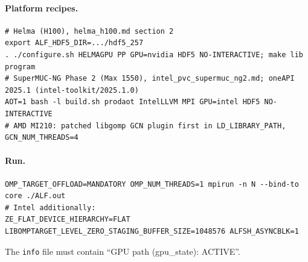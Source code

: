 \paragraph{Platform recipes.}
\begin{lstlisting}
# Helma (H100), helma_h100.md section 2
export ALF_HDF5_DIR=.../hdf5_257
. ./configure.sh HELMAGPU PP GPU=nvidia HDF5 NO-INTERACTIVE; make lib program
# SuperMUC-NG Phase 2 (Max 1550), intel_pvc_supermuc_ng2.md; oneAPI 2025.1 (intel-toolkit/2025.1.0)
AOT=1 bash -l build.sh prodaot IntelLLVM MPI GPU=intel HDF5 NO-INTERACTIVE
# AMD MI210: patched libgomp GCN plugin first in LD_LIBRARY_PATH, GCN_NUM_THREADS=4
\end{lstlisting}

\paragraph{Run.}
\begin{lstlisting}
OMP_TARGET_OFFLOAD=MANDATORY OMP_NUM_THREADS=1 mpirun -n N --bind-to core ./ALF.out
# Intel additionally:
ZE_FLAT_DEVICE_HIERARCHY=FLAT LIBOMPTARGET_LEVEL_ZERO_STAGING_BUFFER_SIZE=1048576 ALFSH_ASYNCBLK=1
\end{lstlisting}
The \texttt{info} file must contain ``GPU path (gpu\_state): ACTIVE''.

